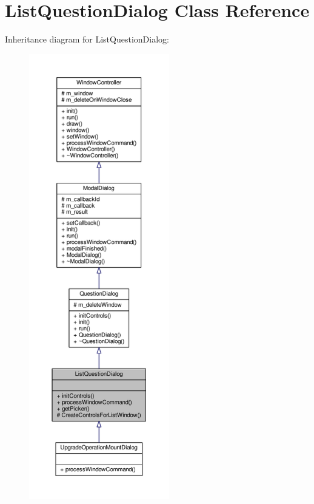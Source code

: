 \hypertarget{classListQuestionDialog}{}\section{List\+Question\+Dialog Class Reference}
\label{classListQuestionDialog}


Inheritance diagram for List\+Question\+Dialog\+:
\nopagebreak
\begin{figure}[H]
\begin{center}
\leavevmode
\includegraphics[height=550pt]{d3/d35/classListQuestionDialog__inherit__graph}
\end{center}
\end{figure}


